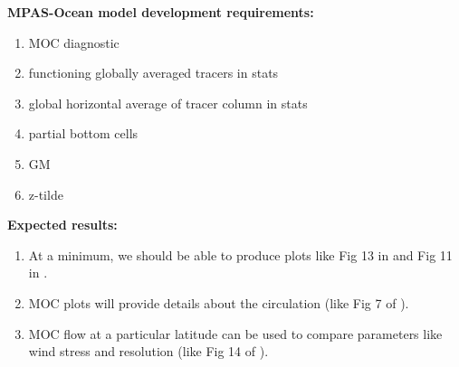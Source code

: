 \documentclass[12pt,letterpaper]{article}
\begin{document}
{\bf MPAS-Ocean model development requirements:}
\begin{enumerate}
\item MOC diagnostic
\item functioning globally averaged tracers in stats
\item global horizontal average of tracer column in stats
\item partial bottom cells
\item GM 
\item z-tilde
\end{enumerate}

{\bf Expected results:}
\begin{enumerate}
\item At a minimum, we should be able to produce plots like Fig 13 in \cite{Nikurashin_Vallis11jpo} and Fig 11 in \cite{Nikurashin_Vallis12jpo}.
\item MOC plots will provide details about the circulation (like Fig 7 of \cite{Hallberg_Gnanadesikan06jpo}).
\item MOC flow at a particular latitude can be used to compare parameters like wind stress and resolution (like Fig 14 of \cite{Hallberg_Gnanadesikan06jpo}).
\end{enumerate}



\end{document}
